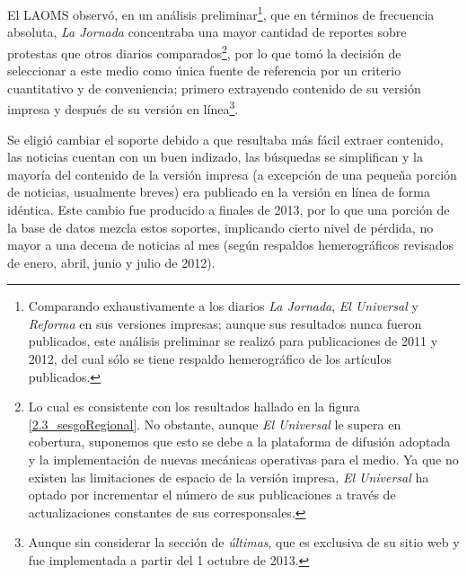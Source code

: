 \documentclass[letterpaper, 11pt]{book}
\theoremstyle{definition}
\theoremstyle{remark}
\begin{document}
El LAOMS observó, en un análisis preliminar\footnote{
    Comparando exhaustivamente a los diarios \emph{La Jornada}, \emph{El Universal} y \emph{Reforma} en sus versiones impresas; aunque sus resultados nunca fueron publicados, este análisis preliminar se realizó para publicaciones de 2011 y 2012, del cual sólo se tiene respaldo hemerográfico de los artículos publicados.
}, que en términos de frecuencia absoluta, \emph{La Jornada} concentraba una mayor cantidad de reportes sobre protestas que otros diarios comparados\footnote{
    Lo cual es consistente con los resultados hallado en la figura \ref{2.3_sesgoRegional}. 
    No obstante, aunque \emph{El Universal} le supera en cobertura, suponemos que esto se debe a la plataforma de difusión adoptada y la implementación de nuevas mecánicas operativas para el medio. 
    Ya que no existen las limitaciones de espacio de la versión impresa, \emph{El Universal}  ha optado por incrementar el número de sus publicaciones a través de actualizaciones constantes de sus corresponsales.
}, por lo que tomó la decisión de seleccionar a este medio como única fuente de referencia por un criterio cuantitativo y de conveniencia; primero extrayendo contenido de su versión impresa y después de su versión en línea\footnote{Aunque sin considerar la sección de \emph{últimas}, que es exclusiva de su sitio web y fue implementada a partir del 1 octubre de 2013.}.

Se eligió cambiar el soporte debido a que resultaba más fácil extraer contenido, las noticias cuentan con un buen indizado, las búsquedas se simplifican y la mayoría del contenido de la versión impresa (a excepción de una pequeña porción de noticias, usualmente breves) era publicado en la versión en línea de forma idéntica. 
Este cambio fue producido a finales de 2013, por lo que una porción de la base de datos mezcla estos soportes, implicando cierto nivel de pérdida, no mayor a una decena de noticias al mes (según respaldos hemerográficos revisados de enero, abril, junio y julio de 2012).
\end{document}
